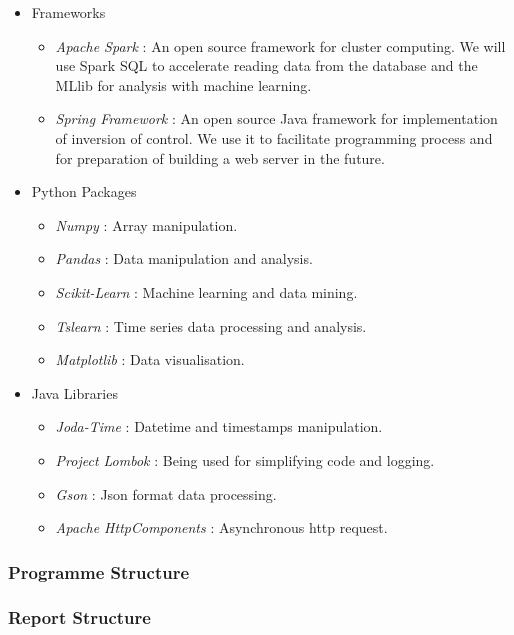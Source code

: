 \documentclass[11pt]{article} %
\theoremstyle{plain}
\theoremstyle{definition}
\begin{document}
\begin{itemize}
  \item Frameworks
  \begin{itemize}
    \item \textsl{Apache Spark} : An open source framework for cluster computing. We will use Spark SQL to accelerate reading data from the database and the MLlib for analysis with machine learning.
    \item \textsl{Spring Framework} : An open source Java framework for implementation of inversion of control. We use it to facilitate programming process and for preparation of building a web server in the future.
  \end{itemize}

  \item Python Packages
  \begin{itemize}
    \item \textsl{Numpy} : Array manipulation.
    \item \textsl{Pandas} : Data manipulation and analysis.
    \item \textsl{Scikit-Learn} : Machine learning and data mining.
    \item \textsl{Tslearn} : Time series data processing and analysis.
    \item \textsl{Matplotlib} : Data visualisation.
  \end{itemize}

  \item Java Libraries
  \begin{itemize}
    \item \textsl{Joda-Time} : Datetime and timestamps manipulation.
    \item \textsl{Project Lombok} : Being used for simplifying code and logging.
    \item \textsl{Gson} : Json format data processing.
    \item \textsl{Apache HttpComponents} : Asynchronous http request.
  \end{itemize}

\end{itemize}

\subsubsection{Programme Structure}
\subsubsection{Report Structure}
\end{document}
